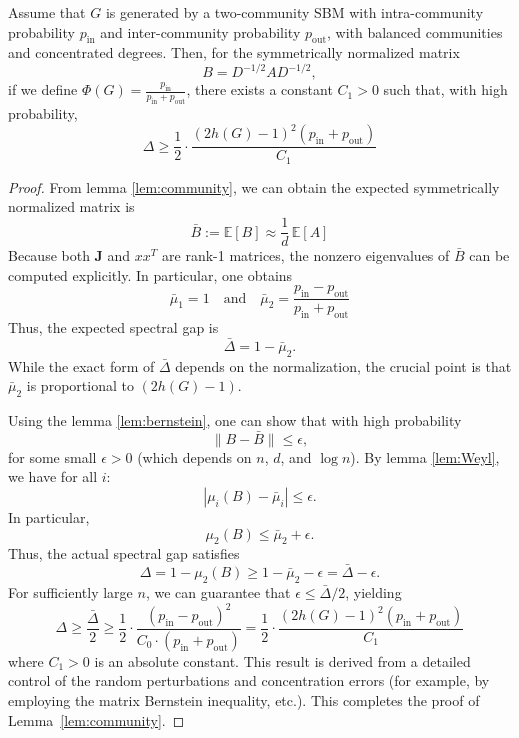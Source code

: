 \begin{lemma}\label{lem:community}
Assume that $G$ is generated by a two-community SBM with intra-community probability $p_{\mathrm{in}}$ and inter-community probability $p_{\mathrm{out}}$, with balanced communities and concentrated degrees. Then, for the symmetrically normalized matrix
\[
B = D^{-1/2} A D^{-1/2},
\]
if we define $\Phi(G) = \frac{p_{\mathrm{in}}}{p_{\mathrm{in}}+p_{\mathrm{out}}}$, there exists a constant $C_1>0$ such that, with high probability,
\[
\Delta \geq \frac{1}{2}\cdot \frac{(2h(G)-1)^2(p_{\mathrm{in}} + p_{\mathrm{out}}) }{C_1}
\]
\end{lemma}
\begin{proof} 
From lemma \ref{lem:community}, we can obtain the expected symmetrically normalized matrix is
\[
\bar{B} := \mathbb{E}[B] \approx \frac{1}{d}\,\mathbb{E}[A] 
\]
Because both $\mathbf{J}$ and $xx^T$ are rank-1 matrices, the nonzero eigenvalues of $\bar{B}$ can be computed explicitly. In particular, one obtains
\[
\bar{\mu}_1 = 1 \quad \text{and} \quad \bar{\mu}_2 = \frac{p_{\mathrm{in}}-p_{\mathrm{out}}}{p_{\mathrm{in}}+p_{\mathrm{out}}} 
\]
Thus, the expected spectral gap is
\[
\bar{\Delta} = 1-\bar{\mu}_2.
\]
While the exact form of $\bar{\Delta}$ depends on the normalization, the crucial point is that $\bar{\mu}_2$ is proportional to $(2h(G)-1)$.

Using the lemma \ref{lem:bernstein}, one can show that with high probability
\[
\|B-\bar{B}\| \le \epsilon,
\]
for some small $\epsilon>0$ (which depends on $n$, $d$, and $\log n$). By lemma \ref{lem:Weyl}, we have for all $i$:
\[
|\mu_i(B)-\bar{\mu}_i| \le \epsilon.
\]
In particular,
\[
\mu_2(B) \le \bar{\mu}_2 + \epsilon.
\]
Thus, the actual spectral gap satisfies
\[
\Delta = 1-\mu_2(B) \ge 1-\bar{\mu}_2 - \epsilon = \bar{\Delta} - \epsilon.
\]
For sufficiently large $n$, we can guarantee that $\epsilon \le \bar{\Delta}/2$, yielding
\[
\Delta \geq \frac{\bar{\Delta}}{2} 
\geq \frac{1}{2}\cdot\frac{(p_{\mathrm{in}}-  p_{\mathrm{out}})^2}{C_0\cdot(p_{\mathrm{in}} +p_{\mathrm{out}})} = \frac{1}{2}\cdot \frac{(2h(G)-1)^2(p_{\mathrm{in}} + p_{\mathrm{out}}) }{C_1}
\]
where $C_1 > 0$ is an absolute constant. This result is derived from a detailed control of the random perturbations and concentration errors (for example, by employing the matrix Bernstein inequality, etc.). This completes the proof of Lemma~\ref{lem:community}.

\end{proof}

